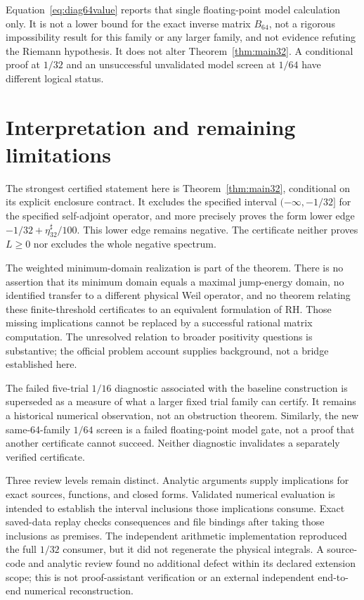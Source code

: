 \documentclass[11pt,a4paper]{article}
\numberwithin{equation}{section}
\theoremstyle{definition}\newtheorem{definition}[theorem]{Definition}
\theoremstyle{remark}\newtheorem{remark}[theorem]{Remark}
\begin{document}
Equation~\eqref{eq:diag64value} reports that single floating-point model calculation only. It is not a lower bound for the exact inverse matrix $B_{64}$, not a rigorous impossibility result for this family or any larger family, and not evidence refuting the Riemann hypothesis. It does not alter Theorem~\ref{thm:main32}. A conditional proof at $1/32$ and an unsuccessful unvalidated model screen at $1/64$ have different logical status.

\section{Interpretation and remaining limitations}\label{sec:limits}
The strongest certified statement here is Theorem~\ref{thm:main32}, conditional on its explicit enclosure contract. It excludes the specified interval $(-\infty,-1/32]$ for the specified self-adjoint operator, and more precisely proves the form lower edge $-1/32+\eta_{32}^{\sharp}/100$. This lower edge remains negative. The certificate neither proves $L\ge0$ nor excludes the whole negative spectrum.

The weighted minimum-domain realization is part of the theorem. There is no assertion that its minimum domain equals a maximal jump-energy domain, no identified transfer to a different physical Weil operator, and no theorem relating these finite-threshold certificates to an equivalent formulation of RH. Those missing implications cannot be replaced by a successful rational matrix computation. The unresolved relation to broader positivity questions is substantive; the official problem account \cite{bombieri} supplies background, not a bridge established here.

The failed five-trial $1/16$ diagnostic associated with the baseline construction is superseded as a measure of what a larger fixed trial family can certify. It remains a historical numerical observation, not an obstruction theorem. Similarly, the new same-64-family $1/64$ screen is a failed floating-point model gate, not a proof that another certificate cannot succeed. Neither diagnostic invalidates a separately verified certificate.

Three review levels remain distinct. Analytic arguments supply implications for exact sources, functions, and closed forms. Validated numerical evaluation is intended to establish the interval inclusions those implications consume. Exact saved-data replay checks consequences and file bindings after taking those inclusions as premises. The independent arithmetic implementation reproduced the full $1/32$ consumer, but it did not regenerate the physical integrals. A source-code and analytic review found no additional defect within its declared extension scope; this is not proof-assistant verification or an external independent end-to-end numerical reconstruction.
\end{document}
